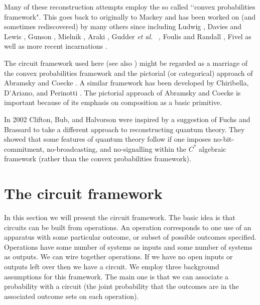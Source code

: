 \documentclass[10pt]{article}
\begin{document}
Many of these reconstruction attempts employ the so called \lq\lq convex probabilities framework".  This goes back to originally to Mackey and has been worked on (and sometimes rediscovered) by many others since including Ludwig \cite{ludwig1985axiomatic}, Davies and Lewis \cite{davies1970operational}, Gunson \cite{gunson1967algebraic}, Mielnik \cite{mielnik1969theory}, Araki \cite{araki1980characterization}, Gudder {\it et al.\ } \cite{gudder1999convex}, Foulis and Randall \cite{foulis1979empirical}, Fivel \cite{fivel1994interference} as well as more recent incarnations \cite{hardy2001quantum, barrett2007information}.

The circuit framework used here \cite{hardy2010formalism, hardy2011reformulating} (see also \cite{hardy2009foliable, hardy2009operational}) might be regarded as a marriage of the convex probabilities framework and the pictorial (or categorical) approach of Abramsky and Coecke \cite{abramsky2004categorical, coecke2010quantum}.   A similar framework has been developed by Chiribella, D'Ariano, and Perinotti \cite{chiribella2010probabilistic}.   The pictorial approach of Abramsky and Coecke is important because of its emphasis on composition as a basic primitive.

In 2002 Clifton, Bub, and Halvorson \cite{clifton2003characterizing} were inspired by a suggestion of Fuchs and Brassard to take a different approach to reconstructing quantum theory. They showed that some features of quantum theory follow if one imposes no-bit-commitment, no-broadcasting, and no-signalling within the $C^*$ algebraic framework (rather than the convex probabilities framework).


\section{The circuit framework}


In this section we will present the circuit framework.  The basic idea is that circuits can be built from operations. An operation corresponds to one use of an apparatus with some particular outcome, or subset of possible outcomes specified.  Operations have some number of systems as inputs and some number of systems as outputs.  We can wire together operations.  If we have no open inputs or outputs left over then we have a circuit.  We employ three background assumptions for this framework. The main one is that we can associate a probability with a circuit (the joint probability that the outcomes are in the associated outcome sets on each operation).
\end{document}
